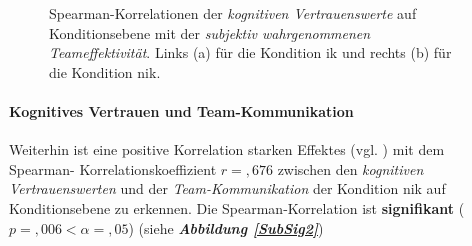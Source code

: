 \documentclass[a4paper,11pt]{article}%
\renewcommand{\\}{\vspace*{0.5\baselineskip} \newline}
\begin{document}
{\begin{figure}[h]
  \centering
  \qquad
  \caption[Spearman-Korrelation kog. Vert. NIK und wahrg. Teameffektivität NIK]{Spearman-Korrelationen der \textit{kognitiven Vertrauenswerte} auf Konditionsebene mit der \textit{subjektiv wahrgenommenen Teameffektivität}. Links (a) für die Kondition \ac{ik} und rechts (b) für die Kondition \ac{nik}.}
  \label{SubSig1}
\end{figure}

\paragraph{Kognitives Vertrauen und  Team-Kommunikation}

Weiterhin ist eine positive Korrelation starken Effektes (vgl. \citep{cohen2013statistical}) mit dem Spearman- Korrelationskoeffizient $r =,676$ zwischen den \textit{kognitiven Vertrauenswerten} und der \textit{Team-Kommunikation} der Kondition \ac{nik} auf Konditionsebene zu erkennen. Die Spearman-Korrelation ist \textbf{signifikant} ($p =,006 < \alpha = ,05$) (siehe \textbf{\textit{Abbildung \ref{SubSig2}}})\\

}
\end{document}
